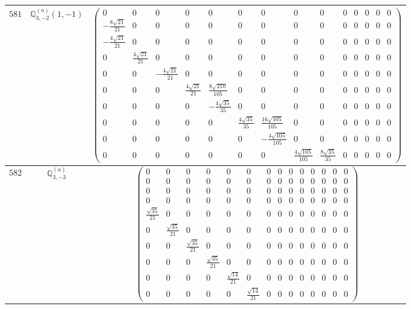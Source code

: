 \documentclass[fleqn,8pt,landscape]{jsarticle}
\begin{document}
\begin{center}
\begin{longtable}{ccc}
$ 581 $ & $ \mathbb{Q}_{3,-2}^{(a)}(1,-1) $ & $ \begin{pmatrix} 0 & 0 & 0 & 0 & 0 & 0 & 0 & 0 & 0 & 0 & 0 & 0 & 0 & 0 \\ - \frac{8 \sqrt{21}}{21} & 0 & 0 & 0 & 0 & 0 & 0 & 0 & 0 & 0 & 0 & 0 & 0 & 0 \\ - \frac{4 \sqrt{21}}{21} & 0 & 0 & 0 & 0 & 0 & 0 & 0 & 0 & 0 & 0 & 0 & 0 & 0 \\ 0 & \frac{4 \sqrt{21}}{21} & 0 & 0 & 0 & 0 & 0 & 0 & 0 & 0 & 0 & 0 & 0 & 0 \\ 0 & 0 & - \frac{4 \sqrt{21}}{21} & 0 & 0 & 0 & 0 & 0 & 0 & 0 & 0 & 0 & 0 & 0 \\ 0 & 0 & 0 & \frac{4 \sqrt{21}}{21} & \frac{8 \sqrt{210}}{105} & 0 & 0 & 0 & 0 & 0 & 0 & 0 & 0 & 0 \\ 0 & 0 & 0 & 0 & - \frac{4 \sqrt{35}}{35} & 0 & 0 & 0 & 0 & 0 & 0 & 0 & 0 & 0 \\ 0 & 0 & 0 & 0 & 0 & \frac{4 \sqrt{35}}{35} & \frac{16 \sqrt{105}}{105} & 0 & 0 & 0 & 0 & 0 & 0 & 0 \\ 0 & 0 & 0 & 0 & 0 & 0 & - \frac{4 \sqrt{105}}{105} & 0 & 0 & 0 & 0 & 0 & 0 & 0 \\ 0 & 0 & 0 & 0 & 0 & 0 & 0 & \frac{4 \sqrt{105}}{105} & \frac{8 \sqrt{35}}{35} & 0 & 0 & 0 & 0 & 0 \end{pmatrix} $ \\ \hline
$ 582 $ & $ \mathbb{Q}_{3,-3}^{(a)} $ & $ \begin{pmatrix} 0 & 0 & 0 & 0 & 0 & 0 & 0 & 0 & 0 & 0 & 0 & 0 & 0 & 0 \\ 0 & 0 & 0 & 0 & 0 & 0 & 0 & 0 & 0 & 0 & 0 & 0 & 0 & 0 \\ 0 & 0 & 0 & 0 & 0 & 0 & 0 & 0 & 0 & 0 & 0 & 0 & 0 & 0 \\ 0 & 0 & 0 & 0 & 0 & 0 & 0 & 0 & 0 & 0 & 0 & 0 & 0 & 0 \\ \frac{\sqrt{35}}{21} & 0 & 0 & 0 & 0 & 0 & 0 & 0 & 0 & 0 & 0 & 0 & 0 & 0 \\ 0 & \frac{\sqrt{35}}{21} & 0 & 0 & 0 & 0 & 0 & 0 & 0 & 0 & 0 & 0 & 0 & 0 \\ 0 & 0 & \frac{\sqrt{35}}{21} & 0 & 0 & 0 & 0 & 0 & 0 & 0 & 0 & 0 & 0 & 0 \\ 0 & 0 & 0 & \frac{\sqrt{35}}{21} & 0 & 0 & 0 & 0 & 0 & 0 & 0 & 0 & 0 & 0 \\ 0 & 0 & 0 & 0 & \frac{\sqrt{14}}{21} & 0 & 0 & 0 & 0 & 0 & 0 & 0 & 0 & 0 \\ 0 & 0 & 0 & 0 & 0 & \frac{\sqrt{14}}{21} & 0 & 0 & 0 & 0 & 0 & 0 & 0 & 0 \end{pmatrix} $ \\ \hline

\end{longtable}
\end{center}
\end{document}

